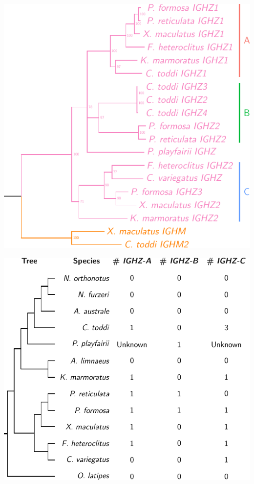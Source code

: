 \documentclass[presentation]{beamer}
\begin{document}
\begin{frame}
\centering
\includegraphics[height=0.9\textheight]{figs/pdf/extra/cz-trees-subclasses}
\end{frame}

\begin{frame}
\centering
\includegraphics[height=0.9\textheight]{figs/pdf/extra/cz-trees-lintree}
\end{frame}
\end{document}
